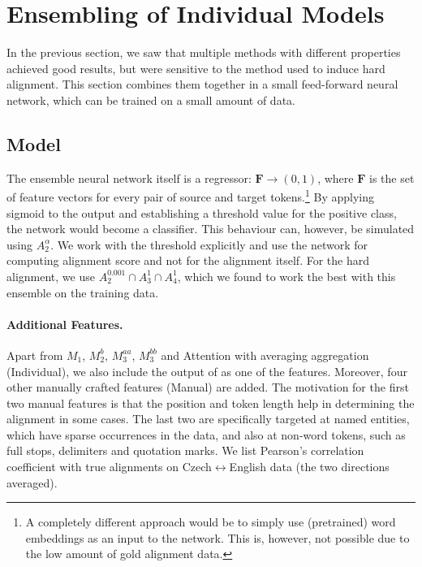 \section{Ensembling of Individual Models} \label{sec:aggregated}

In the previous section, we saw that multiple methods with different properties achieved good results, but were sensitive to the method used to induce hard alignment. This section combines them together in a small feed-forward neural network, which can be trained on a small amount of data.

\subsection{Model}

The ensemble neural network itself is a regressor: $\mathbf{F} \rightarrow (0, 1)$, where $\mathbf{F}$ is the set of feature vectors for every pair of source and target tokens.\footnote{A completely different approach would be to simply use (pretrained) word embeddings as an input to the network. This is, however, not possible due to the low amount of gold alignment data.} By applying sigmoid to the output and establishing a threshold value for the positive class, the network would become a classifier. This behaviour can, however, be simulated using $A_2^\alpha$. We work with the threshold explicitly and use the network for computing alignment score and not for the alignment itself.
For the hard alignment, we use $A_2^{0.001} \cap A_3^{1} \cap A_4^{1}$, which we found to work the best with this ensemble on the training data.

\paragraph{Additional Features.} Apart from $M_1$, $M_2^b$, $M_3^{aa}$, $M_3^{bb}$ and Attention with averaging aggregation (Individual), we also include the output of \fastalign{} as one of the features. Moreover, four other manually crafted features (Manual) are added. The motivation for the first two manual features is that the position and token length help in determining the alignment in some cases. The last two are specifically targeted at named entities, which have sparse occurrences in the data, and also at non-word tokens, such as full stops, delimiters and quotation marks. 
We list Pearson's correlation coefficient with true alignments on Czech$\leftrightarrow$English data (the two directions averaged).

